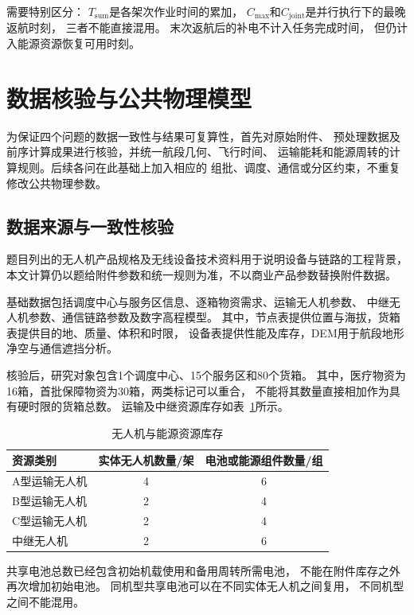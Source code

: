 \documentclass[bwprint]{gmcmthesis}
\begin{document}
需要特别区分：
$T_{\mathrm{sum}}$是各架次作业时间的累加，
$C_{\max}$和$C_{\mathrm{joint}}$是并行执行下的最晚返航时刻，
三者不能直接混用。
末次返航后的补电不计入任务完成时间，
但仍计入能源资源恢复可用时刻。



\section{数据核验与公共物理模型}

为保证四个问题的数据一致性与结果可复算性，首先对原始附件、
预处理数据及前序计算成果进行核验，并统一航段几何、飞行时间、
运输能耗和能源周转的计算规则。后续各问在此基础上加入相应的
组批、调度、通信或分区约束，不重复修改公共物理参数。

\subsection{数据来源与一致性核验}
题目列出的无人机产品规格及无线设备技术资料\cite{dji350,doodle}用于说明设备与链路的工程背景，本文计算仍以题给附件参数和统一规则为准，不以商业产品参数替换附件数据。


基础数据包括调度中心与服务区信息、逐箱物资需求、运输无人机参数、
中继无人机参数、通信链路参数及数字高程模型。
其中，节点表提供位置与海拔，货箱表提供目的地、质量、体积和时限，
设备表提供性能及库存，DEM用于航段地形净空与通信遮挡分析。

核验后，研究对象包含1个调度中心、15个服务区和80个货箱。
其中，医疗物资为16箱，首批保障物资为30箱，两类标记可以重合，
不能将其数量直接相加作为具有硬时限的货箱总数。
运输及中继资源库存如表~\ref{tab:resource_inventory}所示。

\begin{table}[htbp]
    \centering
    \caption{无人机与能源资源库存}
    \label{tab:resource_inventory}
    \begin{tabular}{lcc}
        \toprule
        资源类别 & 实体无人机数量/架 & 电池或能源组件数量/组 \\
        \midrule
        A型运输无人机 & 4 & 6 \\
        B型运输无人机 & 2 & 4 \\
        C型运输无人机 & 2 & 4 \\
        中继无人机   & 2 & 6 \\
        \bottomrule
    \end{tabular}
\end{table}

共享电池总数已经包含初始机载使用和备用周转所需电池，
不能在附件库存之外再次增加初始电池。
同机型共享电池可以在不同实体无人机之间复用，
不同机型之间不能混用。
\end{document}

